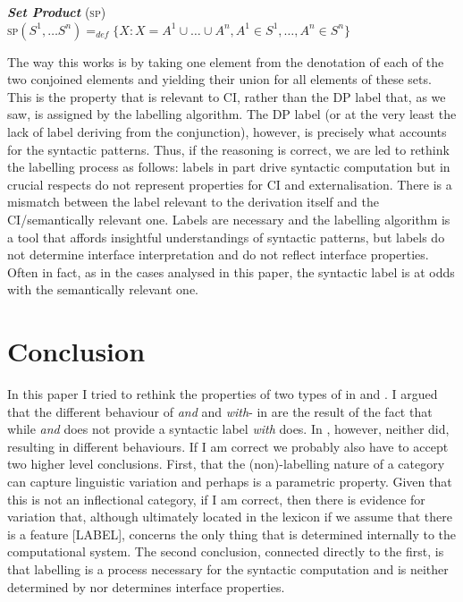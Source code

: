 \documentclass[output=paper]{langsci/langscibook}
\begin{document}
\ea\label{ex:key:29.53b}
    \emph{\textbf{Set Product}} \textsc{(sp)}\\
    \textsc{sp}$(S^1,\dots S^n) =_{def} \{X:X=A^1\cup \dots \cup A^n, A^1 \in S^1,\dots, A^n \in S^n\}$
\z

The way this works is by taking one element from the denotation of each of the
two conjoined elements and yielding their union for all elements of these sets.
This is the property that is relevant to CI, rather than the DP label that, as
we saw, is assigned by the labelling algorithm. The DP label (or
at the very least the lack of label deriving from the conjunction), however, is
precisely what accounts for the syntactic patterns. Thus, if the reasoning is
correct, we are led to rethink the labelling process as follows:
labels in part drive syntactic computation but in crucial respects do not
represent properties for CI and externalisation. There is a mismatch between
the label relevant to the derivation itself and the CI/semantically relevant
one. Labels are necessary and the labelling algorithm is a tool
that affords insightful understandings of syntactic patterns, but labels do not
determine interface interpretation and do not reflect interface properties.
Often in fact, as in the cases analysed in this paper, the syntactic label is
at odds with the semantically relevant one.

\section{Conclusion}

In this paper I tried to rethink the properties of two types of
 in  and . I argued that the
different behaviour of \emph{and} and \emph{with}- in
 are the result of the fact that while \emph{and} does not provide
a syntactic label \emph{with} does. In , however, neither did,
resulting in different behaviours. If I am correct we probably also have to
accept two higher level conclusions. First, that the (non)-labelling nature of
a category can capture linguistic variation and perhaps is a parametric
property. Given that this is not an inflectional category, if I am correct,
then there is evidence for variation that, although ultimately located in the
lexicon if we assume that there is a feature [LABEL], concerns the only thing
that is determined internally to the computational system. The second
conclusion, connected directly to the first, is that labelling is a process
necessary for the syntactic computation and is neither determined by nor
determines interface properties.
\end{document}
